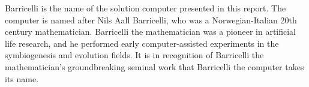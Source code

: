 Barricelli is the name of the solution computer presented in this report.
The computer is named after Nils Aall Barricelli, who was a Norwegian-Italian 20th century mathematician.
Barricelli the mathematician was a pioneer in artificial life research, and he performed early computer-assisted experiments in the symbiogenesis and evolution fields.
It is in recognition of Barricelli the mathematician's groundbreaking seminal work that Barricelli the computer takes its name.
\cite{barricelli-paper}

